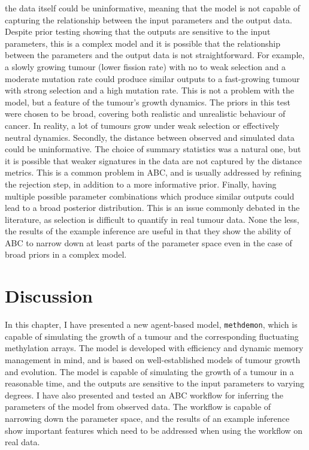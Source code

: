 the data itself could be uninformative, meaning that the model is not capable of
capturing the relationship between the input parameters and the output data.
Despite prior testing showing that the outputs are sensitive to the input
parameters, this is a complex model and it is possible that the relationship
between the parameters and the output data is not straightforward. For example,
a slowly growing tumour (lower fission rate) with no to weak selection and a
moderate mutation rate could produce similar outputs to a fast-growing tumour
with strong selection and a high mutation rate. This is not a problem with the
model, but a feature of the tumour's growth dynamics. The priors in this test
were chosen to be broad, covering both realistic and unrealistic behaviour of
cancer. In reality, a lot of tumours grow under weak selection or effectively
neutral dynamics. Secondly, the distance between observed and simulated data
could be uninformative. The choice of summary statistics was a natural one, but
it is possible that weaker signatures in the data are not captured by the
distance metrics. This is a common problem in ABC, and is usually addressed by
refining the rejection step, in addition to a more informative prior. Finally,
having multiple possible parameter combinations which produce similar outputs
could lead to a broad posterior distribution. This is an issue commonly debated
in the literature, as selection is difficult to quantify in real tumour data.
None the less, the results of the example inference are useful in that they show
the ability of ABC to narrow down at least parts of the parameter space even in
the case of broad priors in a complex model.

\section{Discussion}
In this chapter, I have presented a new agent-based model, \texttt{methdemon},
which is capable of simulating the growth of a tumour and the corresponding
fluctuating methylation arrays. The model is developed with efficiency and
dynamic memory management in mind, and is based on well-established models of
tumour growth and evolution. The model is capable of simulating the growth of a
tumour in a reasonable time, and the outputs are sensitive to the input
parameters to varying degrees. I have also presented and tested an ABC workflow
for inferring the parameters of the model from observed data. The workflow is
capable of narrowing down the parameter space, and the results of an example
inference show important features which need to be addressed when using the
workflow on real data.

